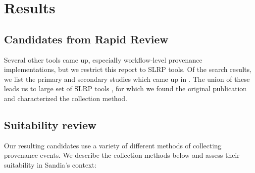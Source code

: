

\section{Results}


\subsection{Candidates from Rapid Review}
\label{section:candidates}

Several other tools came up, especially workflow-level provenance implementations, but we restrict this report to SLRP tools.
Of the search results, we list the primary and secondary studies which came up in .
The union of these leads us to large set of SLRP tools , for which we found the original publication and characterized the collection method.

\subsection{Suitability review}
\label{section:suitability-review}

Our resulting candidates use a variety of different methods of collecting provenance events.
We describe the collection methods below and assess their suitability in Sandia's context:

